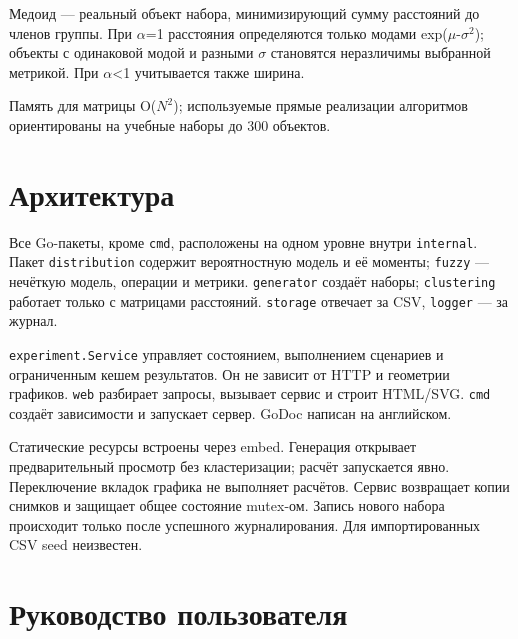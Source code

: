 \documentclass[fontsize=14pt,a4paper]{scrartcl}
\begin{document}
Медоид — реальный объект набора, минимизирующий сумму расстояний до членов группы. При \(\alpha\)=1 расстояния определяются только модами exp(\(\mu\)-\(\sigma^2\)); объекты с одинаковой модой и разными \(\sigma\) становятся неразличимы выбранной метрикой. При \(\alpha\)<1 учитывается также ширина.

Память для матрицы O(\(N^2\)); используемые прямые реализации алгоритмов ориентированы на учебные наборы до 300 объектов.

\section{Архитектура}

Все Go-пакеты, кроме \texttt{cmd}, расположены на одном уровне внутри \texttt{internal}. Пакет \texttt{distribution} содержит вероятностную модель и её моменты; \texttt{fuzzy} — нечёткую модель, операции и метрики. \texttt{generator} создаёт наборы; \texttt{clustering} работает только с матрицами расстояний. \texttt{storage} отвечает за CSV, \texttt{logger} — за журнал.

\texttt{experiment.Service} управляет состоянием, выполнением сценариев и ограниченным кешем результатов. Он не зависит от HTTP и геометрии графиков. \texttt{web} разбирает запросы, вызывает сервис и строит HTML/SVG. \texttt{cmd} создаёт зависимости и запускает сервер. GoDoc написан на английском.

Статические ресурсы встроены через embed. Генерация открывает предварительный просмотр без кластеризации; расчёт запускается явно. Переключение вкладок графика не выполняет расчётов. Сервис возвращает копии снимков и защищает общее состояние mutex-ом. Запись нового набора происходит только после успешного журналирования. Для импортированных CSV seed неизвестен.

\section{Руководство пользователя}
\end{document}
